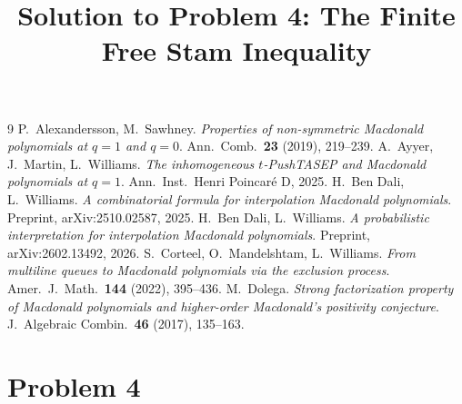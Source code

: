 \documentclass[11pt]{article}
\begin{document}
\begin{thebibliography}{9}
 P.~Alexandersson, M.~Sawhney.
  \emph{Properties of non-symmetric Macdonald polynomials at $q=1$ and $q=0$}.
  Ann.\ Comb.\ \textbf{23} (2019), 219--239.
 A.~Ayyer, J.~Martin, L.~Williams.
  \emph{The inhomogeneous $t$-PushTASEP and Macdonald polynomials at $q=1$}.
  Ann.\ Inst.\ Henri Poincar\'e D, 2025.
 H.~Ben Dali, L.~Williams.
  \emph{A combinatorial formula for interpolation Macdonald polynomials}.
  Preprint, arXiv:2510.02587, 2025.
 H.~Ben Dali, L.~Williams.
  \emph{A probabilistic interpretation for interpolation Macdonald polynomials}.
  Preprint, arXiv:2602.13492, 2026.
 S.~Corteel, O.~Mandelshtam, L.~Williams.
  \emph{From multiline queues to Macdonald polynomials via the exclusion process}.
  Amer.\ J.\ Math.\ \textbf{144} (2022), 395--436.
 M.~Dolega.
  \emph{Strong factorization property of Macdonald polynomials and higher-order
  Macdonald's positivity conjecture}.
  J.\ Algebraic Combin.\ \textbf{46} (2017), 135--163.
\end{thebibliography}

\endgroup

\clearpage
\section*{Problem 4}
\begingroup
\hypersetup{colorlinks=true,
            linkcolor=blue!50!black,
            citecolor=blue!50!black,
            urlcolor=blue!50!black}
\newcommand{\qfourR}{\mathbb{R}}
\newcommand{\qfourZ}{\mathbb{Z}}
\newcommand{\qfourbn}{\boxplus_n}
\newcommand{\qfourScore}{\mathsf{S}^{\mathrm{ff}}_n}
\newcommand{\qfourInfo}{\mathcal{K}^{\mathrm{ff}}_n}
\newcommand{\qfourRootMap}{\Psi_{\qfourbn}}
\newcommand{\qfourJac}{\mathsf{D}_{\qfourbn}}
\newcommand{\qfourVar}{\operatorname{Var}}
\newcommand{\qfourHess}{\operatorname{Hess}}
\newcommand{\qfourPSD}{\succeq 0}
\newcommand{\qfoursgn}{\operatorname{sgn}}
\newtheorem{qfourtheorem}{Theorem}
\newtheorem{qfourlemma}{Lemma}
\newtheorem{qfourproposition}{Proposition}
\newtheorem{qfourcorollary}{Corollary}
\theoremstyle{definition}
\newtheorem{qfourobservation}{Observation}
\title{Solution to Problem 4: The Finite Free Stam Inequality}
\author{}
\date{}
\maketitle
\end{document}
